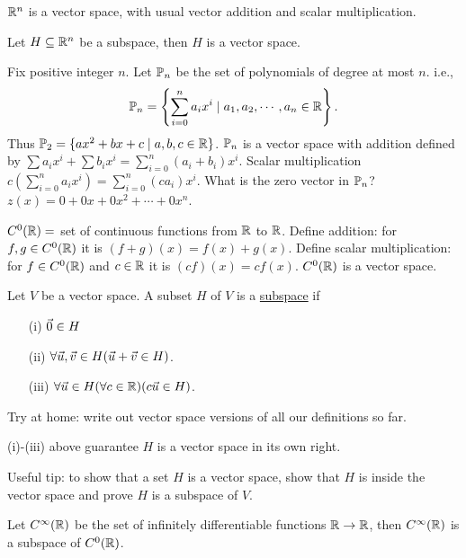 \documentclass[10pt,a4paper]{article}
\begin{document}
\begin{example}
	$\mathbb{R}^n$ is a vector space, with usual vector addition and scalar multiplication.
\end{example}
\begin{example}
	Let $H\subseteq \mathbb{R}^n$ be a subspace, then $H$ is a vector space.
\end{example}
\begin{example}
	Fix positive integer $n$. Let $\mathbb{P}_n$ be the set of polynomials of degree at most $n$. i.e., 
	$$\mathbb{P}_n = \left\{\sum_{i=0}^n a_i x^i \mid a_1,a_2,\cdots,a_n \in \mathbb{R} \right\}.$$ 
	Thus $\mathbb{P}_2 = \{ax^2 + bx +c \mid a,b,c\in\mathbb{R}\}$. $\mathbb{P}_n$ is a vector space with addition defined by $\sum a_i x^i + \sum b_i x^i = \sum_{i=0}^n (a_i +b_i)x^i$. Scalar multiplication $c(\sum_{i=0}^n a_i x^i) = \sum_{i=0}^n (ca_i)x^i$. What is the zero vector in $\mathbb{P}_n$? $z(x) = 0 + 0x + 0x^2 + \cdots + 0x^n$.
\end{example}
\begin{example}
	$C^0(\mathbb{R}) = $ set of continuous functions from $\mathbb{R}$ to $\mathbb{R}$. Define addition: for $f,g\in C^0(\mathbb{R})$ it is $(f+g)(x) = f(x) + g(x)$. Define scalar multiplication: for $f\in C^0(\mathbb{R})$ and $c\in\mathbb{R}$ it is $(cf)(x) = c f(x)$. $C^0(\mathbb{R})$ is a vector space.
\end{example}

\begin{definition}
	Let $V$ be a vector space. A subset $H$ of $V$ is a \underline{subspace} if 
	\begin{enumerate}
		\item [(i)] $\vec{0}\in H$
		\item[(ii)] $\forall\vec{u},\vec{v}\in H(\vec{u}+\vec{v} \in H)$.
		\item[(iii)] $\forall\vec{u}\in H(\forall c\in \mathbb{R})(c\vec{u} \in H)$.
	\end{enumerate}
\end{definition}
	Try at home: write out vector space versions of all our definitions so far.
\begin{remark}
	(i)-(iii) above guarantee $H$ is a vector space in its own right. 
\end{remark}

Useful tip: to show that a set $H$ is a vector space, show that $H$ is inside the vector space and prove $H$ is a subspace of $V$.

\begin{example}
	Let $C^\infty(\mathbb{R})$ be the set of infinitely differentiable functions $\mathbb{R} \rightarrow \mathbb{R}$, then $C^\infty(\mathbb{R})$ is a subspace of $C^0(\mathbb{R})$.
\end{example}
\end{document}

